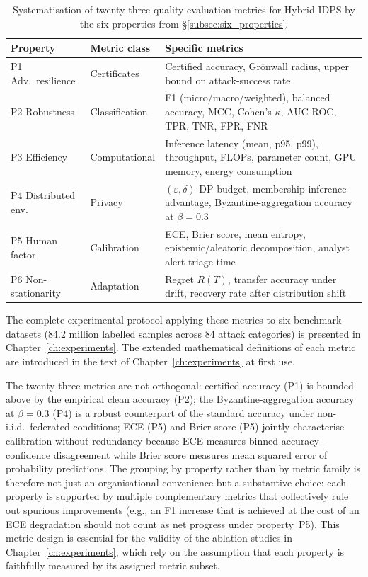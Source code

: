 \begin{table}[H]
\centering
\caption{Systematisation of twenty-three quality-evaluation metrics
for Hybrid IDPS by the six properties from
\S\ref{subsec:six_properties}.}
\label{tab:metrics_by_property}
\small
\setlength{\tabcolsep}{4pt}
\renewcommand{\arraystretch}{0.92}\begin{tabular}{l p{3.0cm} p{9.3cm}}
\toprule
\textbf{Property} & \textbf{Metric class} & \textbf{Specific metrics} \\
\midrule
P1 Adv.\ resilience       & Certificates       & Certified accuracy, Grönwall radius, upper bound on attack-success rate \\
\addlinespace
P2 Robustness             & Classification     & F1 (micro/macro/weighted), balanced accuracy, MCC, Cohen's $\kappa$, AUC-ROC, TPR, TNR, FPR, FNR \\
\addlinespace
P3 Efficiency             & Computational      & Inference latency (mean, p95, p99), throughput, FLOPs, parameter count, GPU memory, energy consumption \\
\addlinespace
P4 Distributed env.       & Privacy            & $(\varepsilon,\delta)$-DP budget, membership-inference advantage, Byzantine-aggregation accuracy at $\beta=0.3$ \\
\addlinespace
P5 Human factor           & Calibration        & ECE, Brier score, mean entropy, epistemic/aleatoric decomposition, analyst alert-triage time \\
\addlinespace
P6 Non-stationarity       & Adaptation         & Regret $R(T)$, transfer accuracy under drift, recovery rate after distribution shift \\
\bottomrule
\end{tabular}
\end{table}

The complete experimental protocol applying these metrics to six
benchmark datasets (84.2 million labelled samples across 84 attack
categories) is presented in Chapter~\ref{ch:experiments}. The
extended mathematical definitions of each metric are introduced in
the text of Chapter~\ref{ch:experiments} at first use.

The twenty-three metrics are not orthogonal: certified accuracy (P1) is bounded above by the empirical clean accuracy (P2); the Byzantine-aggregation accuracy at $\beta=0.3$ (P4) is a robust counterpart of the standard accuracy under non-i.i.d.\ federated conditions; ECE (P5) and Brier score (P5) jointly characterise calibration without redundancy because ECE measures binned accuracy--confidence disagreement while Brier score measures mean squared error of probability predictions. The grouping by property rather than by metric family is therefore not just an organisational convenience but a substantive choice: each property is supported by multiple complementary metrics that collectively rule out spurious improvements (e.g., an F1 increase that is achieved at the cost of an ECE degradation should not count as net progress under property~P5). This metric design is essential for the validity of the ablation studies in Chapter~\ref{ch:experiments}, which rely on the assumption that each property is faithfully measured by its assigned metric subset.

